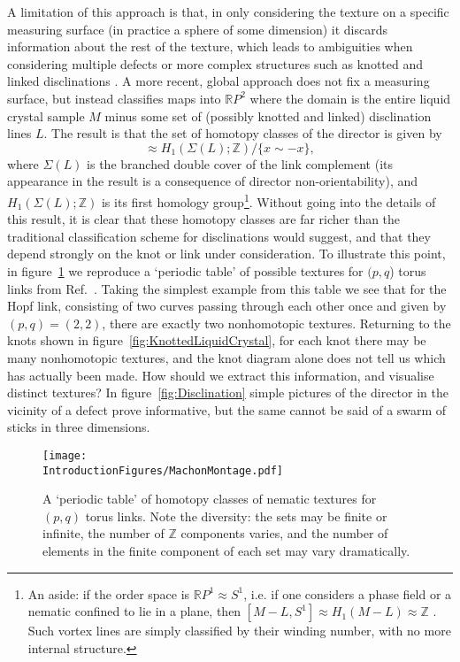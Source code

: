A limitation of this approach is that, in only considering the texture on a specific measuring surface (in practice a sphere of some dimension) it discards information about the rest of the texture, which leads to ambiguities when considering multiple defects or more complex structures such as knotted and linked disclinations \citep{Alexander2012,Machon2014,Machon2016,MachonThesis}. A more recent, global approach \citep{Machon2014,Machon2016,MachonThesis} does not fix a measuring surface, but instead classifies maps into $\mathbb{R}P^2$ where the domain is the entire liquid crystal sample $M$ minus some set of (possibly knotted and linked) disclination lines $L$. The result is that the set of homotopy classes of the director is given by
\begin{equation}
[M-L, \mathbb{R}P^2] \approx H_1(\Sigma(L); \mathbb{Z})/\{ x \sim -x\},
\label{eq:HomotopyClassification}
\end{equation}
where $\Sigma(L)$ is the branched double cover of the link complement (its appearance in the result is a consequence of director non-orientability), and $H_1(\Sigma(L); \mathbb{Z})$ is its first homology group\footnote{An aside: if the order space is $ \mathbb{R}P^1 \approx S^1$, i.e. if one considers a phase field or a nematic confined to lie in a plane, then $[M-L, S^1] \approx H_1(M-L) \approx \mathbb{Z}$ \citep{Lickorish1997}. Such vortex lines are simply classified by their winding number, with no more internal structure.}. Without going into the details of this result, it is clear that these homotopy classes are far richer than the traditional classification scheme for disclinations would suggest, and that they depend strongly on the knot or link under consideration. To illustrate this point, in figure~\ref{fig:MachonMontage} we reproduce a `periodic table' of possible textures for $(p,q$) torus links from Ref.~\citep{MachonThesis}. Taking the simplest example from this table we see that for the Hopf link, consisting of two curves passing through each other once and given by $(p,q)=(2,2)$, there are exactly two nonhomotopic textures. Returning to the knots shown in figure~\ref{fig:KnottedLiquidCrystal}, for each knot there may be many nonhomotopic textures, and the knot diagram alone does not tell us which has actually been made. How should we extract this information, and visualise distinct textures? In figure~\ref{fig:Disclination} simple pictures of the director in the vicinity of a defect prove informative, but the same cannot be said of a swarm of sticks in three dimensions.
\begin{figure}[htbp]
\centering
\texttt{[image: \\IntroductionFigures/MachonMontage.pdf]}
\caption{A `periodic table' of homotopy classes of nematic textures for $(p,q)$ torus links. Note the diversity: the sets may be finite or infinite, the number of $\mathbb{Z}$ components varies, and the number of elements in the finite component of each set may vary dramatically.}
\label{fig:MachonMontage}
\end{figure}

